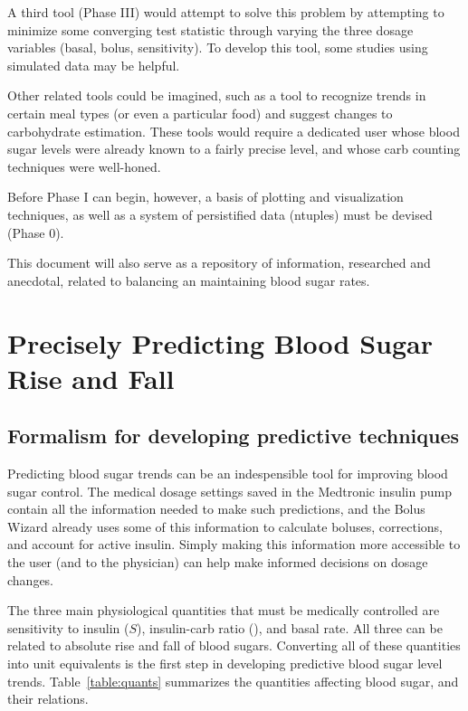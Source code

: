 A third tool (Phase III) would attempt to solve this problem by attempting to minimize some 
converging test statistic through varying the three dosage variables (basal, bolus, sensitivity). To 
develop this tool, some studies using simulated data may be helpful.

Other related tools could be imagined, such as a tool to recognize trends in certain meal types (or 
even a particular food) and suggest changes to carbohydrate estimation. These tools would require a 
dedicated user whose blood sugar levels were already known to a fairly precise level, and whose carb 
counting techniques were well-honed.

Before Phase I can begin, however, a basis of plotting and visualization techniques, as well as a 
system of persistified data (ntuples) must be devised (Phase 0).

This document will also serve as a repository of information, researched and anecdotal, related to 
balancing an maintaining blood sugar rates.


\section{Precisely Predicting Blood Sugar Rise and Fall}

\subsection{Formalism for developing predictive techniques}

Predicting blood sugar trends can be an indespensible tool for improving blood sugar control.
The medical dosage settings saved in the Medtronic insulin pump contain all the information
needed to make such predictions, and the Bolus Wizard already uses some of this information to
calculate boluses, corrections, and account for active insulin. Simply making this information
more accessible to the user (and to the physician) can help make informed decisions on dosage
changes.

The three main physiological quantities that must be medically controlled are sensitivity to insulin
($S$), insulin-carb ratio (\carbratio), and basal rate. All three can be related to absolute rise and
fall of blood sugars. Converting all of these quantities into \mgdl unit equivalents is the first
step in developing predictive blood sugar level trends. Table~\ref{table:quants} summarizes the
quantities affecting blood sugar, and their relations.

